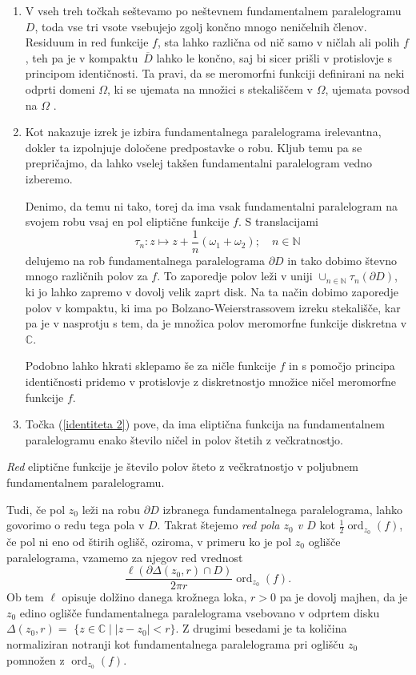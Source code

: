\documentclass[mat1]{fmfdelo}
\numberwithin{equation}{section}
\newcommand{\N}{\mathbb N}
\newcommand{\C}{\mathbb C}
\newcommand{\om}{\omega}
\newcommand{\ord}[2]{\operatorname{ord}_{#1}(#2)}
\newcommand{\olsi}[1]{\,\overline{\!{#1}}} %
\theoremstyle{definition}
\begin{document}
\begin{opomba}
    \label{liouville opomba}
    \begin{enumerate}
        \item
        V vseh treh točkah seštevamo po neštevnem fundamentalnem paralelogramu $D$, toda vse tri vsote vsebujejo zgolj končno mnogo neničelnih členov. Residuum in red funkcije $f$, sta lahko različna od nič samo v ničlah ali polih $f$, teh pa je v kompaktu $\olsi{D}$ lahko le končno, saj bi sicer prišli v protislovje s principom identičnosti. Ta pravi, da se meromorfni funkciji definirani na neki odprti domeni $\Omega$, ki se ujemata na množici s stekališčem v $\Omega$, ujemata povsod na $\Omega$ \cite[]{}.
        \item 
        Kot nakazuje izrek je izbira fundamentalnega paralelograma irelevantna, dokler ta izpolnjuje določene predpostavke o robu. Kljub temu pa se prepričajmo, da lahko vselej takšen fundamentalni paralelogram vedno izberemo. 

        Denimo, da temu ni tako, torej da ima vsak fundamentalni paralelogram na svojem robu vsaj en pol eliptične funkcije $f$. S translacijami
        \[
            \tau_n : z \mapsto z + \frac{1}{n}(\om_1 + \om_2); \quad n\in \N
        \]
        delujemo na rob fundamentalnega paralelograma $\partial D$ in tako dobimo števno mnogo različnih polov za $f$. To zaporedje polov leži v uniji $\cup_{n \in \N} \tau_n(\partial D)$, ki jo lahko zapremo v dovolj velik zaprt disk. Na ta način dobimo zaporedje polov v kompaktu, ki ima po Bolzano-Weierstrassovem izreku stekališče, kar pa je v nasprotju s tem, da je množica polov meromorfne funkcije diskretna v $\C$. 
        
        Podobno lahko hkrati sklepamo še za ničle funkcije $f$ in s pomočjo principa identičnosti pridemo v protislovje z diskretnostjo množice ničel meromorfne funkcije $f$.
        \item 
        Točka (\ref{identiteta 2}) pove, da ima eliptična funkcija na fundamentalnem paralelogramu enako število ničel in polov štetih z večkratnostjo. 
    \end{enumerate}
\end{opomba}

\begin{definicija}
    \emph{Red} eliptične funkcije je število polov šteto z večkratnostjo v poljubnem fundamentalnem paralelogramu. 
\end{definicija}

Tudi, če pol $z_0$ leži na robu $\partial D$ izbranega fundamentalnega paralelograma, lahko govorimo o redu tega pola v $D$. Takrat štejemo \emph{red pola $z_0$ v $D$} kot $\frac{1}{2}\ord{z_0}{f}$, če pol ni eno od štirih oglišč, oziroma, v primeru ko je pol $z_0$ oglišče paralelograma, vzamemo za njegov red vrednost
\[
    \frac{\ell(\partial \Delta(z_0, r) \cap D)}{2 \pi r}\ord{z_0}{f}.
\]
Ob tem $\ell$ opisuje dolžino danega krožnega loka, $r > 0$ pa je dovolj majhen, da je $z_0$ edino oglišče fundamentalnega paralelograma vsebovano v odprtem disku ${\Delta(z_0, r) =}$ ${\{z \in \C \mid \left\lvert z - z_0 \right\rvert < r\}}$. Z drugimi besedami je ta količina normaliziran notranji kot fundamentalnega paralelograma pri oglišču $z_0$ pomnožen z $\ord{z_0}{f}$.  
\end{document}
